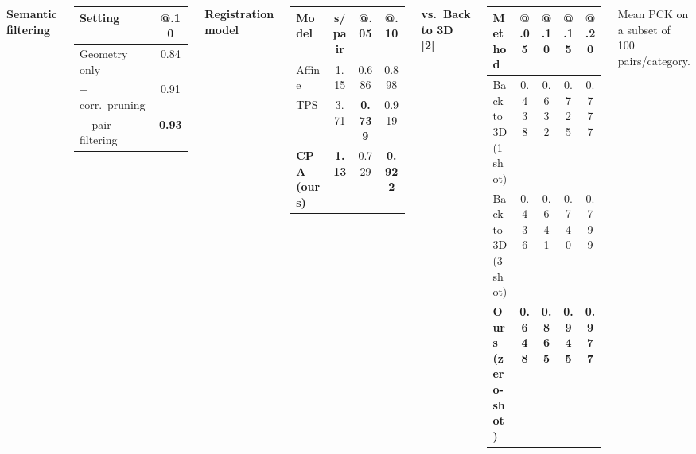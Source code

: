 \documentclass[20pt,margin=1.0cm,blockverticalspace=1.1cm]{tikzposter}
\begin{document}
\begin{columns}
{\vspace{0.8em}
\begin{minipage}[t]{0.235\linewidth}
\centering
{\Large\textbf{Semantic filtering}\vphantom{Akg}}\par
\vspace{0.2em}
\normalsize
\setlength{\tabcolsep}{4pt}
\begin{tabular}{lc}
\toprule
\textbf{Setting} & \textbf{@.10} \\
\midrule
Geometry only & 0.84 \\
+ corr.\ pruning & 0.91 \\
\rowcolor{oursrow}
+ pair filtering & \textbf{0.93} \\
\bottomrule
\end{tabular}
\end{minipage}\hfill
\begin{minipage}[t]{0.315\linewidth}
\centering
{\Large\textbf{Registration model}\vphantom{Akg}}\par
\vspace{0.2em}
\normalsize
\setlength{\tabcolsep}{4pt}
\begin{tabular}{lccc}
\toprule
\textbf{Model} & \textbf{s/pair} & \textbf{@.05} & \textbf{@.10} \\
\midrule
Affine & 1.15 & 0.686 & 0.898 \\
TPS & 3.71 & \textbf{0.739} & 0.919 \\
\rowcolor{oursrow}
\textbf{CPA (ours)} & \textbf{1.13} & 0.729 & \textbf{0.922} \\
\bottomrule
\end{tabular}
\end{minipage}\hfill
\begin{minipage}[t]{0.42\linewidth}
\centering
{\Large\textbf{vs.\ Back to 3D [2]}\vphantom{Akg}}\par
\vspace{0.2em}
\normalsize
\setlength{\tabcolsep}{4pt}
\begin{tabular}{lcccc}
\toprule
\textbf{Method} & \textbf{@.05} & \textbf{@.10} & \textbf{@.15} & \textbf{@.20} \\
\midrule
Back to 3D (1-shot) & 0.438 & 0.632 & 0.725 & 0.777 \\
Back to 3D (3-shot) & 0.436 & 0.641 & 0.740 & 0.799 \\
\rowcolor{oursrow}
\textbf{Ours (zero-shot)} & \textbf{0.648} & \textbf{0.865} & \textbf{0.945} & \textbf{0.977} \\
\bottomrule
\end{tabular}\par
\vspace{0.2em}
{\normalsize Mean PCK on a subset of 100 pairs/category.}
\end{minipage}
}


\end{columns}
\end{document}
